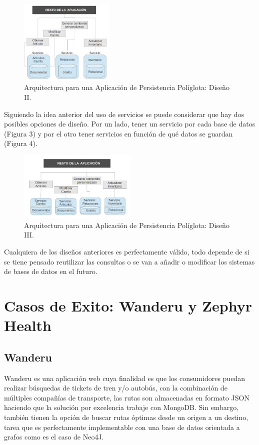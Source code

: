 \documentclass[conference]{IEEEtran}
\begin{document}
\begin{figure}[!h]
\centering
\includegraphics[width=0.4\textwidth]{3}
\caption{Arquitectura para una Aplicaci\'on de Persistencia Pol\'iglota: Diseño II.}
\label{fig3}
\end{figure}

Siguiendo la idea anterior del uso de servicios se puede considerar que hay dos posibles opciones de diseño. Por un lado, tener un servicio por cada base de datos (Figura 3) y por el otro tener servicios en funci\'on de qu\'e datos se guardan (Figura 4).

\begin{figure}[!h]
\centering
\includegraphics[width=0.5\textwidth]{4}
\caption{Arquitectura para una Aplicaci\'on de Persistencia Pol\'iglota: Diseño III.}
\label{fig4}
\end{figure}
Cualquiera de los diseños anteriores es perfectamente v\'alido, todo depende de si se tiene pensado reutilizar las consultas o se van a añadir o modificar los sistemas de bases de datos en el futuro.

\section{Casos de Exito: Wanderu y Zephyr Health}
\subsection{Wanderu}
Wanderu es una aplicaci\'on web cuya finalidad es que los consumidores puedan realizar b\'usquedas de tickets de tren y/o autob\'us, con la combinaci\'on de múltiples compañías de transporte, las rutas son almacenadas en formato JSON haciendo que la soluci\'on por excelencia trabaje con MongoDB. Sin embargo, tambi\'en tienen la opción de buscar rutas \'optimas desde un origen a un destino, tarea que es perfectamente implementable con una base de datos orientada a grafos como es el caso de Neo4J.\cite{wanderu}
\end{document}
